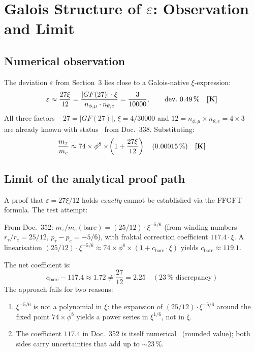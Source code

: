\section{Galois Structure of $\varepsilon$: Observation and Limit}

\subsection{Numerical observation}

The deviation $\varepsilon$ from Section~3 lies close to a Galois-native
$\xi$-expression:
\begin{equation}\label{eq:eps_galois}
  \varepsilon \approx \frac{27\xi}{12}
  = \frac{|GF(27)|\cdot\xi}{n_{\phi,\mu}\cdot n_{\theta,e}}
  = \frac{3}{10000}, \qquad \text{dev.\ } 0{.}49\,\% \quad \textbf{[K]}
\end{equation}
All three factors -- $27 = |GF(27)|$, $\xi = 4/30000$ and
$12 = n_{\phi,\mu}\times n_{\theta,e} = 4\times3$ -- are already known
with status \BM\ from Doc.~338. Substituting:
\begin{equation}
  \frac{m_\tau}{m_e} \approx 74\times\phi^8\times\!\left(1+\frac{27\xi}{12}\right)
  \quad (0{.}00015\,\%) \quad \textbf{[K]}
\end{equation}

\subsection{Limit of the analytical proof path}

A proof that $\varepsilon = 27\xi/12$ holds \emph{exactly} cannot be
established via the FFGFT formula. The test attempt:

From Doc.~352: $m_\tau/m_e(\text{bare}) = (25/12)\cdot\xi^{-5/6}$
(from winding numbers $r_\tau/r_e = 25/12$, $p_\tau-p_e=-5/6$), with
fraktal correction coefficient $117{.}4\cdot\xi$. A linearisation
$(25/12)\cdot\xi^{-5/6} \approx 74\times\phi^8\times(1+c_\text{bare}\cdot\xi)$
yields $c_\text{bare} \approx 119{.}1$.

The net coefficient is:
\[
  c_\text{bare} - 117{.}4 \approx 1{.}72 \neq \frac{27}{12} = 2{.}25
  \quad (23\,\%\text{ discrepancy})
\]
The approach fails for two reasons:
\begin{enumerate}
  \item $\xi^{-5/6}$ is not a polynomial in $\xi$: the expansion of
    $(25/12)\cdot\xi^{-5/6}$ around the fixed point $74\times\phi^8$ yields
    a power series in $\xi^{1/6}$, not in $\xi$.
  \item The coefficient $117{.}4$ in Doc.~352 is itself numerical \KM\
    (rounded value); both sides carry uncertainties that add up to $\sim23\,\%$.
\end{enumerate}

